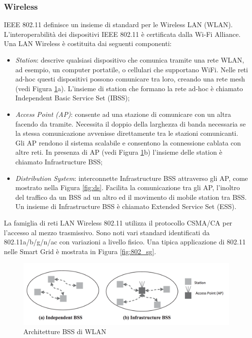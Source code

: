 \subsubsection{Wireless}
IEEE 802.11 definisce un insieme di standard per le Wireless LAN (WLAN). L'interoperabilità dei dispositivi IEEE 802.11 è certificata dalla Wi-Fi Alliance. Una LAN Wireless è costituita dai seguenti componenti:
\begin{itemize}
	\item\emph{Station}: descrive qualsiasi dispositivo che comunica tramite una rete WLAN, ad esempio, un computer portatile, o cellulari che supportano WiFi. Nelle reti ad-hoc questi dispositivi possono comunicare tra loro, creando una rete mesh (vedi Figura \ref{fig:bss}a). L'insieme di station che formano la rete ad-hoc è chiamato Independent Basic Service Set (IBSS);
	\item\emph{Access Point (AP)}: consente ad una stazione di comunicare con un altra facendo da tramite. Necessita il doppio della larghezza di banda necessaria se la stessa comunicazione avvenisse direttamente tra le stazioni comunicanti. Gli AP rendono il sistema scalabile e consentono la connessione cablata con altre reti. In presenza di AP (vedi Figura \ref{fig:bss}b) l'insieme delle station è chiamato Infrastructure BSS;
	\item\emph{Distribution System}: interconnette Infrastructure BSS attraverso gli AP, come mostrato nella Figura \ref{fig:ds}. Facilita la comunicazione tra gli AP, l'inoltro del traffico da un BSS ad un altro ed il movimento di mobile station tra BSS. Un insieme di Infrastructure BSS è chiamato Extended Service Set (ESS).
\end{itemize}
La famiglia di reti LAN Wireless 802.11 utilizza il protocollo CSMA/CA per l'accesso al mezzo trasmissivo. Sono noti vari standard identificati da 802.11a/b/g/n/ac con variazioni a livello fisico. Una tipica applicazione di 802.11 nelle Smart Grid è mostrata in Figura \ref{fig:802_sg}.
\begin{figure}[h]
	\centering
	\includegraphics[scale=0.350]{imgs/bss.png}
	\caption{Architetture BSS di WLAN} \label{fig:bss}
\end{figure}
